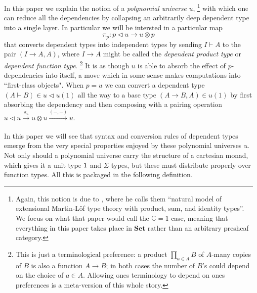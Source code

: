 \documentclass[11pt, one side, article]{memoir}
\theoremstyle{definition}
\theoremstyle{plain}
\newcommand{\Cat}[1]{\mathbf{#1}}%
\newcommand{\To}[2][]{\xrightarrow[#1]{#2}}
\newcommand{\smset}{\Cat{Set}}
\newcommand{\0}{\textsf{0}}
\newcommand{\1}{\tn{\textsf{1}}}
\newcommand{\tri}{\mathbin{\triangleleft}}
\newcommand{\switch}{\pi}
\begin{document}
In this paper we explain the notion of a \emph{polynomial universe} $u$,%
\footnote{Again, this notion is due to \cite[Theorem 16]{awodey2014natural}, where he calls them ``natural model of extensional Martin-L\"{o}f type theory with
product, sum, and identity types''. We focus on what that paper would call the $\mathbb{C}=1$ case, meaning that everything in this paper takes place in $\smset$ rather than an arbitrary presheaf category.}
with which one can reduce all the dependencies by collapsing an arbitrarily deep dependent type into a single layer. In particular we will be intersted in a particular map
\begin{equation}\label{eqn.switch}
  \switch_p\colon p\tri u\to u\otimes p
\end{equation}
that converts dependent types into independent types by sending $I\vdash A$ to the pair $(I\to A,A)$, where $I\to A$ might be called the \emph{dependent product type} or \emph{dependent function type}.%
\footnote{This is just a terminological preference: a product $\prod_{a\in A}B$ of $A$-many copies of $B$ is also a function $A\to B$; in both cases the number of $B$'s could depend on the choice of $a\in A$. Allowing ones terminology to depend on ones preferences is a meta-version of this whole story.}
It is as though $u$ is able to absorb the effect of $p$-dependencies into itself, a move which in some sense makes computations into ``first-class objects". When $p=u$ we can convert a dependent type $(A\vdash B)\in u\tri u(1)$ all the way to a base type $(A\to B,A)\in u(1)$ by first absorbing the dependency and then composing with a pairing operation $u\tri u\To{\switch_u} u\otimes u\To{(-,-)} u$.

In this paper we will see that syntax and conversion rules of dependent types  emerge from the very special properties enjoyed by these polynomial universes $u$. Not only should a polynomial universe carry the structure of a cartesian monad, which gives it a unit type $\1$ and $\Sigma$ types, but these must distribute properly over function types. All this is packaged in the following definition.
\end{document}
